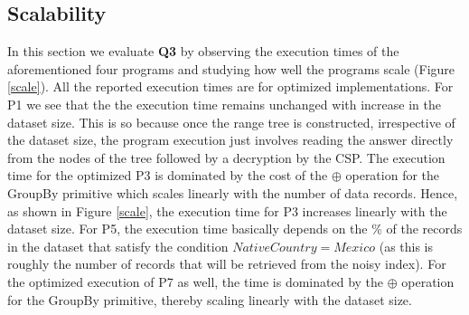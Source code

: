 \subsection{Scalability}
In this section we evaluate \textbf{Q3} by observing the execution times of the aforementioned four \system programs and studying how well the programs scale (Figure \ref{scale}). All the reported execution times are for optimized implementations. For P1 we see that the the execution time remains unchanged with increase in the dataset size. This is so because once the range tree is constructed, irrespective of the dataset size, the program execution just involves reading the answer directly from the nodes of the tree followed by a decryption by the \textsf{CSP}. The execution time for the optimized P3 is dominated by the cost of the $\oplus$ operation for the \textsf{GroupBy} primitive which scales linearly with the number of data records. Hence, as shown in Figure \ref{scale}, the execution time for P3 increases linearly with the dataset size. For P5, the execution time basically depends on the \% of the records in the dataset that satisfy the condition $NativeCountry=Mexico$ (as this is roughly the number of records that will be retrieved from the noisy index). %
 For the optimized execution of P7  as well, the time is dominated by the $\oplus$ operation for the \textsf{GroupBy} primitive, thereby scaling linearly with the dataset size.   %
